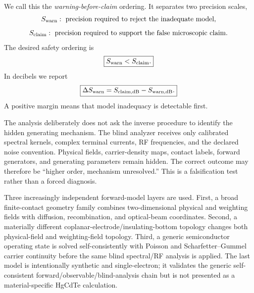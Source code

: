\documentclass[11pt]{article}
\begin{document}
We call this the \emph{warning-before-claim} ordering. It separates two precision scales,
\begin{equation}
S_{\rm warn}:\ \text{precision required to reject the inadequate model},
\end{equation}
\begin{equation}
S_{\rm claim}:\ \text{precision required to support the false microscopic claim}.
\end{equation}
The desired safety ordering is
\begin{equation}
\boxed{S_{\rm warn}<S_{\rm claim}.}
\label{eq:warning_order}
\end{equation}
In decibels we report
\begin{equation}
\boxed{\Delta S_{\rm warn}=S_{\rm claim,dB}-S_{\rm warn,dB}.}
\label{eq:warning_margin}
\end{equation}
A positive margin means that model inadequacy is detectable first.

The analysis deliberately does not ask the inverse procedure to identify the hidden generating mechanism. The blind analyzer receives only calibrated spectral kernels, complex terminal currents, RF frequencies, and the declared noise convention. Physical fields, carrier-density maps, contact labels, forward generators, and generating parameters remain hidden. The correct outcome may therefore be ``higher order, mechanism unresolved.'' This is a falsification test rather than a forced diagnosis.

Three increasingly independent forward-model layers are used. First, a broad finite-contact geometry family combines two-dimensional physical and weighting fields with diffusion, recombination, and optical-beam coordinates. Second, a materially different coplanar-electrode/insulating-bottom topology changes both physical-field and weighting-field topology. Third, a generic semiconductor operating state is solved self-consistently with Poisson and Scharfetter--Gummel carrier continuity before the same blind spectral/RF analysis is applied. The last model is intentionally synthetic and single-electron; it validates the generic self-consistent forward/observable/blind-analysis chain but is not presented as a material-specific HgCdTe calculation.
\end{document}
